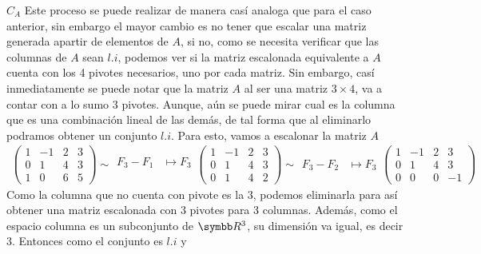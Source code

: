     \begin{mathcase}{\(C_A\)}
        Este proceso se puede realizar de manera casí analoga que para el caso anterior, sin embargo el mayor cambio es no tener que escalar una matriz generada apartir de elementos de \(A\),
        si no, como se necesita verificar que las columnas de \(A\) sean \(l.i\), podemos ver si la matriz escalonada equivalente a \(A\) cuenta con los 4 pivotes necesarios, uno por cada matriz.
        Sin embargo, casí inmediatamente se puede notar que la matriz \(A\) al ser una matriz \(3 \times 4\), va a contar con a lo sumo \(3\) pivotes.
        Aunque, aún se puede mirar cual es la columna que es una combinación lineal de las demás, de tal forma que al eliminarlo podramos obtener un conjunto \(l.i\).
        Para esto, vamos a escalonar la matriz \(A\)
        \[
            \begin{aligned}
                \begin{pmatrix}
                    1 & -1 & 2 & 3 \\
                    0 & 1 & 4 & 3 \\
                    1 & 0 & 6 & 5
                \end{pmatrix}
                \sim
                \begin{aligned}
                    F_3 - F_1 &\mapsto F_3 \\
                \end{aligned}
                \begin{pmatrix}
                    1 & -1 & 2 & 3 \\
                    0 & 1 & 4 & 3 \\
                    0 & 1 & 4 & 2
                \end{pmatrix}
                \sim
                \begin{aligned}
                    F_3 - F_2 &\mapsto F_3
                \end{aligned}
                \begin{pmatrix}
                    1 & -1 & 2 & 3 \\
                    0 & 1 & 4 & 3 \\
                    0 & 0 & 0 & -1
                \end{pmatrix}
            \end{aligned}
        \]
        Como la columna que no cuenta con pivote es la 3, podemos eliminarla para así obtener una matriz escalonada con 3 pivotes para 3 columnas.
        Además, como el espacio columna es un subconjunto de \(\realR^3\), su dimensión va igual, es decir 3. Entonces como el conjunto es \(l.i\) y 

\end{mathcase}
